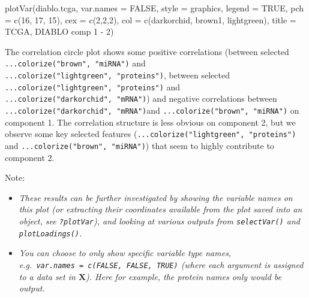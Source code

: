 \documentclass[
]{book}
\newenvironment{Shaded}{\begin{snugshade}}{\end{snugshade}}
\newcommand{\AttributeTok}[1]{\textcolor[rgb]{0.77,0.63,0.00}{#1}}
\newcommand{\ConstantTok}[1]{\textcolor[rgb]{0.00,0.00,0.00}{#1}}
\newcommand{\DecValTok}[1]{\textcolor[rgb]{0.00,0.00,0.81}{#1}}
\newcommand{\FunctionTok}[1]{\textcolor[rgb]{0.00,0.00,0.00}{#1}}
\newcommand{\NormalTok}[1]{#1}
\newcommand{\StringTok}[1]{\textcolor[rgb]{0.31,0.60,0.02}{#1}}
\begin{document}
\begin{Shaded}
\begin{Highlighting}[]
\FunctionTok{plotVar}\NormalTok{(diablo.tcga, }\AttributeTok{var.names =} \ConstantTok{FALSE}\NormalTok{, }\AttributeTok{style =} \StringTok{\textquotesingle{}graphics\textquotesingle{}}\NormalTok{, }\AttributeTok{legend =} \ConstantTok{TRUE}\NormalTok{, }
        \AttributeTok{pch =} \FunctionTok{c}\NormalTok{(}\DecValTok{16}\NormalTok{, }\DecValTok{17}\NormalTok{, }\DecValTok{15}\NormalTok{), }\AttributeTok{cex =} \FunctionTok{c}\NormalTok{(}\DecValTok{2}\NormalTok{,}\DecValTok{2}\NormalTok{,}\DecValTok{2}\NormalTok{), }
        \AttributeTok{col =} \FunctionTok{c}\NormalTok{(}\StringTok{\textquotesingle{}darkorchid\textquotesingle{}}\NormalTok{, }\StringTok{\textquotesingle{}brown1\textquotesingle{}}\NormalTok{, }\StringTok{\textquotesingle{}lightgreen\textquotesingle{}}\NormalTok{),}
        \AttributeTok{title =} \StringTok{\textquotesingle{}TCGA, DIABLO comp 1 {-} 2\textquotesingle{}}\NormalTok{)}
\end{Highlighting}
\end{Shaded}



The correlation circle plot shows some positive correlations (between selected \texttt{...colorize("brown",\ "miRNA")} and \texttt{...colorize("lightgreen",\ "proteins")}, between selected \texttt{...colorize("lightgreen",\ "proteins")} and \texttt{...colorize("darkorchid",\ "mRNA")}) and negative correlations between \texttt{...colorize("darkorchid",\ "mRNA")}and \texttt{...colorize("brown",\ "miRNA")} on component 1. The correlation structure is less obvious on component 2, but we observe some key selected features (\texttt{...colorize("lightgreen",\ "proteins")} and \texttt{...colorize("brown",\ "miRNA")}) that seem to highly contribute to component 2.

Note:

\begin{itemize}
\item
  \emph{These results can be further investigated by showing the variable names on this plot (or extracting their coordinates available from the plot saved into an object, see \texttt{?plotVar}), and looking at various outputs from \texttt{selectVar()} and \texttt{plotLoadings()}.}
\item
  \emph{You can choose to only show specific variable type names, e.g.~\texttt{var.names\ =\ c(FALSE,\ FALSE,\ TRUE)} (where each argument is assigned to a data set in \(\boldsymbol X\)). Here for example, the protein names only would be output.}
\end{itemize}
\end{document}

